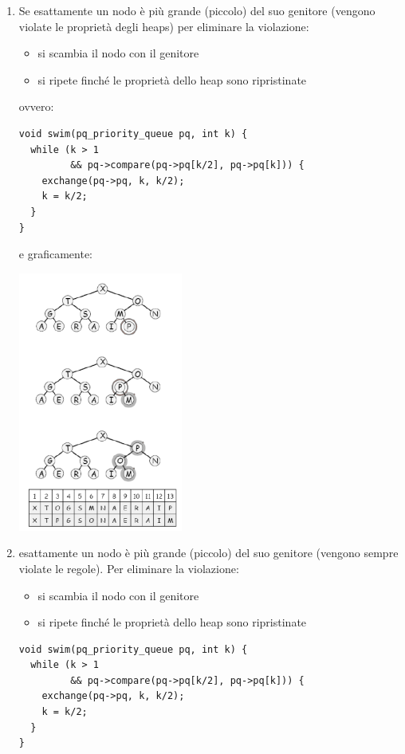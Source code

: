 \documentclass[a4paper,12pt, oneside]{book}
\begin{document}
\begin{enumerate}
\item
Se esattamente un nodo è più grande (piccolo) del suo genitore (vengono violate le proprietà degli heaps) per eliminare la violazione:
\begin{itemize}
\item si scambia il nodo con il genitore
\item si ripete finché le proprietà dello heap sono ripristinate
\end{itemize}
ovvero:
\begin{verbatim}
void swim(pq_priority_queue pq, int k) {
  while (k > 1
         && pq->compare(pq->pq[k/2], pq->pq[k])) {
    exchange(pq->pq, k, k/2);
    k = k/2;
  }
}
\end{verbatim}
\newpage
e graficamente: 
\begin{center}
\includegraphics[scale=4]{img/c9.png}
\end{center}
\item 
esattamente un nodo è più grande (piccolo) del suo genitore (vengono sempre violate le regole). Per eliminare la violazione:
\begin{itemize}
\item si scambia il nodo con il genitore
\item si ripete finché le proprietà dello heap sono ripristinate
\end{itemize}
\begin{verbatim}
void swim(pq_priority_queue pq, int k) {
  while (k > 1
         && pq->compare(pq->pq[k/2], pq->pq[k])) {
    exchange(pq->pq, k, k/2);
    k = k/2;
  }
}
\end{verbatim}
\begin{center}

\end{center}
\end{enumerate}
\end{document}
